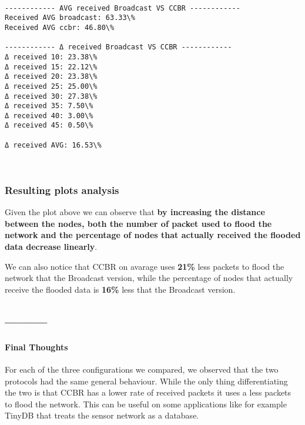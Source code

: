 \documentclass[11pt]{article}
\begin{document}
    \begin{center}
    \end{center}
    { \hspace*{\fill} \\}
    
    \begin{Verbatim}[commandchars=\\\{\}]
------------ AVG received Broadcast VS CCBR ------------
Received AVG broadcast: 63.33\%
Received AVG ccbr: 46.80\%

------------ Δ received Broadcast VS CCBR ------------
Δ received 10: 23.38\%
Δ received 15: 22.12\%
Δ received 20: 23.38\%
Δ received 25: 25.00\%
Δ received 30: 27.38\%
Δ received 35: 7.50\%
Δ received 40: 3.00\%
Δ received 45: 0.50\%

Δ received AVG: 16.53\%

    \end{Verbatim}

    \begin{center}
    \end{center}
    { \hspace*{\fill} \\}
    
    \hypertarget{resulting-plots-analysis}{%
\subsubsection{Resulting plots
analysis}\label{resulting-plots-analysis}}

Given the plot above we can observe that \textbf{by increasing the
distance between the nodes, both the number of packet used to flood the
network and the percentage of nodes that actually received the flooded
data decrease linearly}.

We can also notice that CCBR on avarage uses \textbf{21\%} less packets
to flood the network that the Broadcast version, while the percentage of
nodes that actually receive the flooded data is \textbf{16\%} less that
the Broadcast version.

\hypertarget{section}{%
\subsection{---------}\label{section}}

\hypertarget{final-thoughts}{%
\paragraph{Final Thoughts}\label{final-thoughts}}

For each of the three configurations we compared, we observed that the
two protocols had the same general behaviour. While the only thing
differentiating the two is that CCBR has a lower rate of received
packets it uses a less packets to flood the network. This can be useful
on some applications like for example TinyDB that treats the sensor
network as a database.


    
    
    
    
\end{document}
